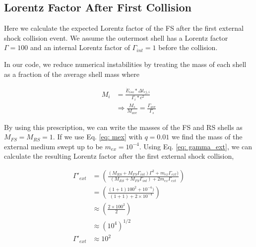 \documentclass[linenumbers,twocolumn]{aastex631}
\begin{document}
\newpage



\begin{appendix}

\section{Lorentz Factor After First Collision}

Here we calculate the expected Lorentz factor of the FS after the first external shock collision event. We assume the outermost shell has a Lorentz factor $\Gamma=100$ and an internal Lorentz factor of $\Gamma_{int}=1$ before the collision.

In our code, we reduce numerical instabilities by treating the mass of each shell as a fraction of the average shell mass where

\begin{align}
	M_i &= \frac{\dot{E}_{iso}*\Delta t_{ej,i}}{\Gamma_i*c^2}\\
	&\Rightarrow \frac{M_s}{M_{ave}} = \frac{\Gamma_{ave}}{\Gamma_s}
\end{align}

By using this prescription, we can write the masses of the FS and RS shells as $M_{FS} = M_{RS} = 1$. If we use Eq. \ref{eq: mex} with $q=0.01$ we find the mass of the external medium swept up to be $m_{ex} = 10^{-4}$. Using Eq. \ref{eq: gamma_ext}, we can calculate the resulting Lorentz factor after the first external shock collision,

\begin{align}
	\Gamma'_{ext} &= \left(\frac{(M_{RS} + M_{FS}\Gamma_{int})\Gamma^2 + m_{ex}\Gamma_{ext})}{(M_{RS}+M_{FS}\Gamma_{int}) + 2m_{ex}\Gamma_{ext}}\right)\\
	&= \left(\frac{(1 + 1)100^2 + 10^{-4})}{(1+1) + 2\times10^{-4}}\right)\\
	&\approx \left(\frac{2\times100^2}{2}\right)\\
	&\approx (10^4)^{1/2} \\
	\Gamma'_{ext} &\approx 10^2
\end{align}

\end{appendix}
\end{document}
